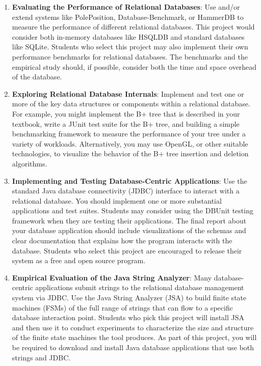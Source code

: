 \begin{enumerate}

  \item {\bf Evaluating the Performance of Relational Databases}: Use and/or extend systems like PolePosition,
    Database-Benchmark, or HammerDB to measure the performance of different relational databases.  This project would
    consider both in-memory databases like HSQLDB and standard databases like SQLite.  Students who select this project
    may also implement their own performance benchmarks for relational databases.  The benchmarks and
    the empirical study should, if possible, consider both the time and space overhead of the database.

  \item {\bf Exploring Relational Database Internals}: Implement and test one or more of the key data structures or
    components within a relational database.  For example, you might implement the B+ tree that is described in your
    textbook, write a JUnit test suite for the B+ tree, and building a simple benchmarking framework to measure the
    performance of your tree under a variety of workloads.  Alternatively, you may use OpenGL, or other suitable
    technologies, to visualize the behavior of the B+ tree insertion and deletion algorithms.

  \item {\bf Implementing and Testing Database-Centric Applications}: Use the standard Java database connectivity (JDBC)
    interface to interact with a relational database.  You should implement one or more substantial applications and
    test suites.  Students may consider using the DBUnit testing framework when they are testing their applications.
    The final report about your database application should include visualizations of the schemas and clear
    documentation that explains how the program interacts with the database.  Students who select this project are
    encouraged to release their system as a free and open source program.  

  \item {\bf Empirical Evaluation of the Java String Analyzer}: Many database-centric applications submit strings to the
    relational database management system via JDBC.  Use the Java String Analyzer (JSA) to build finite state machines
    (FSMs) of the full range of strings that can flow to a specific database interaction point.  Students who pick this
    project will install JSA and then use it to conduct experiments to characterize the size and structure of the finite
    state machines the tool produces.  As part of this project, you will be required to download and install Java
    database applications that use both strings and JDBC.  




    
\end{enumerate} 




